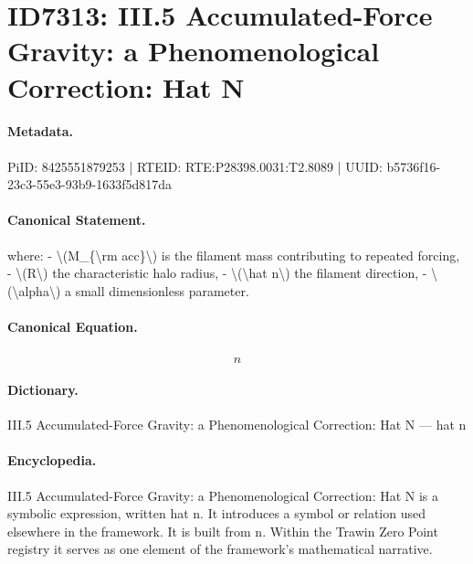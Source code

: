 \section*{ID7313: III.5 Accumulated-Force Gravity: a Phenomenological Correction: Hat N}
\paragraph{Metadata.}
PiID: 8425551879253 | RTEID: RTE:P28398.0031:T2.8089 | UUID: b5736f16-23c3-55e3-93b9-1633f5d817da

\paragraph{Canonical Statement.}
where: - \textbackslash{}(M\_\{\textbackslash{}rm acc\}\textbackslash{}) is the filament mass contributing to repeated forcing, - \textbackslash{}(R\textbackslash{}) the characteristic halo radius, - \textbackslash{}(\textbackslash{}hat n\textbackslash{}) the filament direction, - \textbackslash{}(\textbackslash{}alpha\textbackslash{}) a small dimensionless parameter.

\paragraph{Canonical Equation.}
\[
\hat n
\]

\paragraph{Dictionary.}
III.5 Accumulated-Force Gravity: a Phenomenological Correction: Hat N — hat n

\paragraph{Encyclopedia.}
III.5 Accumulated-Force Gravity: a Phenomenological Correction: Hat N is a symbolic expression, written hat n. It introduces a symbol or relation used elsewhere in the framework. It is built from n. Within the Trawin Zero Point registry it serves as one element of the framework's mathematical narrative.
